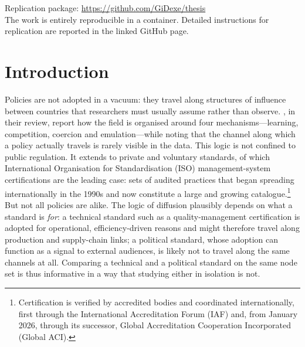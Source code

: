 \documentclass[12pt,a4paper]{article}
\begin{document}
\begin{center}
    \small
    Replication package: \url{https://github.com/GiDexe/thesis}\\
    The work is entirely reproducible in a container. Detailed instructions for replication are reported in the linked GitHub page.
\end{center}

\vfill


\newpage
\tableofcontents
\clearpage

\section{Introduction}
\label{sec:introduction}

Policies are not adopted in a vacuum: they travel along structures of influence between
countries that researchers must usually assume rather than observe. \citet{gilardi2019},
in their review, report how the field is organised around four mechanisms---learning,
competition, coercion and emulation---while noting that the channel along which a policy
actually travels is rarely visible in the data. This logic is not confined to public
regulation. It extends to private and voluntary standards, of which International
Organisation for Standardisation (ISO) management-system certifications are the leading
case: sets of audited practices that began spreading internationally in the 1990s and now
constitute a large and growing catalogue.\footnote{Certification is verified by accredited
    bodies and coordinated internationally, first through the International Accreditation
    Forum (IAF) and, from January 2026, through its successor, Global Accreditation
    Cooperation Incorporated (Global ACI).} But not all policies are alike. The logic of
diffusion plausibly depends on what a standard is \emph{for}: a technical standard such
as a quality-management certification is adopted for operational, efficiency-driven reasons
and might therefore travel along production and supply-chain links; a political standard,
whose adoption can function as a signal to external audiences, is likely not to travel along
the same channels at all. Comparing a technical and a political standard on the same node
set is thus informative in a way that studying either in isolation is not.
\end{document}
